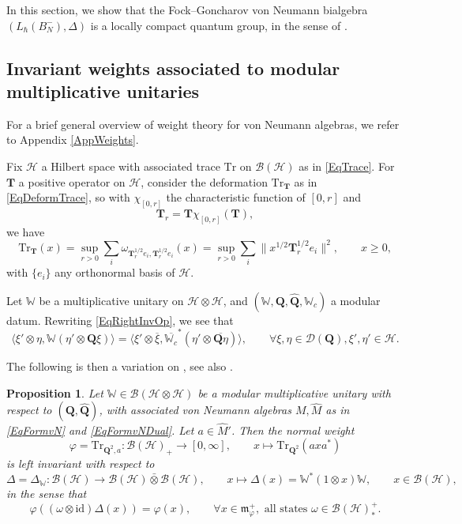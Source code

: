 \documentclass[11pt, reqno]{amsart}
\newtheorem{prop}[theorem]{Proposition}
\theoremstyle{definition}
\numberwithin{equation}{section}
\def\msD{\mathscr D}
\def\Hc{\mathcal H}
\newcommand{\Hsp}{\mathcal{H}}
\newcommand{\Bc}{\mathcal{B}}
\newcommand{\Qb}{\mathbf{Q}}
\newcommand{\Bor}{B}
\newcommand{\id}{\mathrm{id}}
\newcommand{\Tr}{\mathrm{Tr}}
\newcommand{\Wbb}{\mathbb{W}}
\newcommand{\wWbb}{\mathbb{W}_c}
\newcommand{\mfm}{\mathfrak{m}}
\newcommand{\Tb}{\mathbf{T}}
\begin{document}
In this section, we show that the Fock--Goncharov von Neumann bialgebra $(L_{\hbar}(\Bor_N^-),\Delta)$ is a locally compact quantum group, in the sense of \cite{KV03}. 


\subsection{Invariant weights associated to modular multiplicative unitaries}

For a brief general overview of weight theory for von Neumann algebras, we refer to Appendix \ref{AppWeights}.

Fix $\Hc$ a Hilbert space with associated trace $\Tr$ on $\Bc(\Hc)$ as in \eqref{EqTrace}. For $\Tb$ a positive operator on $\Hc$, consider the deformation $\Tr_{\Tb}$ as in \eqref{EqDeformTrace}, so with $\chi_{[0,r]}$ the characteristic function of $[0,r]$ and 
\[
\Tb_r = \Tb \chi_{[0,r]}(\Tb),
\]
we have 
\[
\Tr_{\Tb}(x) = \sup_{r>0} \sum_i \omega_{\Tb_r^{1/2}e_i,\Tb_r^{1/2}e_i}(x) = \sup_{r>0} \sum_i \|x^{1/2}\Tb_r^{1/2}e_i\|^2,\qquad x\geq 0,
\] 
with $\{e_i\}$ any orthonormal basis of $\Hc$. 

Let $\Wbb$ be a multiplicative unitary on $\Hc\otimes \Hc$, and $(\Wbb,\Qb,\hat{\Qb},\wWbb)$ a modular datum. Rewriting \eqref{EqRightInvOp}, we see that
\begin{equation}\label{EqRightInvOpAlt}
\langle \xi'\otimes \eta,\Wbb(\eta'\otimes \Qb\xi)\rangle = \langle \xi'\otimes \overline{\xi},\overline{\wWbb}^*(\eta'\otimes \overline{\Qb\eta})\rangle,\qquad \forall \xi,\eta\in \msD(\Qb),\xi',\eta'\in \Hc.
\end{equation}

The following is then a variation on \cite[Theorem 1.1]{Wor03}, see also \cite{VVD03}. 

\begin{prop}\label{PropTechn}
Let $\Wbb\in \Bc(\Hc\otimes \Hc)$ be a modular multiplicative unitary with respect to $(\Qb,\hat{\Qb})$, with associated von Neumann algebras $M,\hat{M}$ as in \eqref{EqFormvN} and \eqref{EqFormvNDual}. Let $a \in \hat{M}'$. Then the normal weight 
\[
\varphi = \Tr_{\Qb^2,a}\colon  \Bc(\Hc)_+ \rightarrow [0,\infty],\qquad x \mapsto \Tr_{\Qb^2}(axa^*)
\]
is left invariant with respect to 
\[
\Delta = \Delta_{\Wbb}\colon  \Bc(\Hc)\rightarrow \Bc(\Hc)\bar{\otimes}\Bc(\Hc),\qquad x \mapsto\Delta(x) = \Wbb^*(1\otimes x)\Wbb,\qquad x\in \Bc(\Hsp),
\]
in the sense that 
\begin{equation}\label{EqLeftInvLem}
\varphi((\omega \otimes \id)\Delta(x)) = \varphi(x),\qquad \forall x \in \mfm_{\varphi}^+, \textrm{ all states }\omega \in \Bc(\Hc)_*^+.
\end{equation}
\end{prop} 
\end{document}
